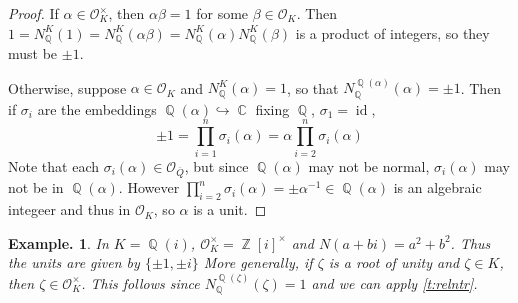 \documentclass[11pt, a4paper]{memoir}
\DeclareMathOperator{\Q}{{\mathbb{Q}}}
\DeclareMathOperator{\Z}{{\mathbb{Z}}}
\DeclareMathOperator{\C}{{\mathbb{C}}}
\newcommand{\hto}[0]{\ensuremath{\hookrightarrow}}
\newcommand{\ol}[1]{\ensuremath{\overline{#1}}}
\theoremstyle{change}
\theoremstyle{plain}
\theoremstyle{nonumberplain}
\newtheorem{example}{Example.}
\newtheorem{proof}{Proof}
\DeclareMathOperator{\id}{id}
\numberwithin{equation}{section}
\begin{document}
\begin{proof}
    If $\alpha\in\mathcal{O}_K^\times$, then $\alpha\beta=1$ for some $\beta\in\mathcal{O}_K$.
    Then $1=N_{\Q}^K(1)=N_{\Q}^K(\alpha\beta)=N_{\Q}^K(\alpha)N_{\Q}^K(\beta)$ is a product of integers, so they must be $\pm 1$.

    Otherwise, suppose $\alpha\in\mathcal{O}_K$ and $N_{\Q}^K(\alpha)=1$, so that $N_{\Q}^{\Q(\alpha)}(\alpha)=\pm 1$.
    Then if $\sigma_i$ are the embeddings $\Q(\alpha)\hto\C$ fixing $\Q$, $\sigma_1=\id$,
    \begin{equation*}
        \pm 1 =\prod_{i=1}^n\sigma_i(\alpha)=\alpha\prod_{i=2}^n\sigma_i(\alpha)
    \end{equation*}
    Note that each $\sigma_i(\alpha)\in\mathcal{O}_{\ol{Q}}$, but since $\Q(\alpha)$ may not be normal, $\sigma_i(\alpha)$ may not be in $\Q(\alpha)$.
    However $\prod_{i=2}^n\sigma_i(\alpha)=\pm\alpha^{-1}\in\Q(\alpha)$ is an algebraic integeer and thus in $\mathcal{O}_K$, so $\alpha$ is a unit.
\end{proof}
\begin{example}
    In $K=\Q(i)$, $\mathcal{O}_K^\times=\Z[i]^\times$ and $N(a+bi)=a^2+b^2$.
    Thus the units are given by $\{\pm 1,\pm i\}$
    More generally, if $\zeta$ is a root of unity and $\zeta\in K$, then $\zeta\in\mathcal{O}_K^\times$.
    This follows since $N_{\Q}^{\Q(\zeta)}(\zeta)=1$ and we can apply \cref{t:relntr}.
\end{example}
\end{document}
